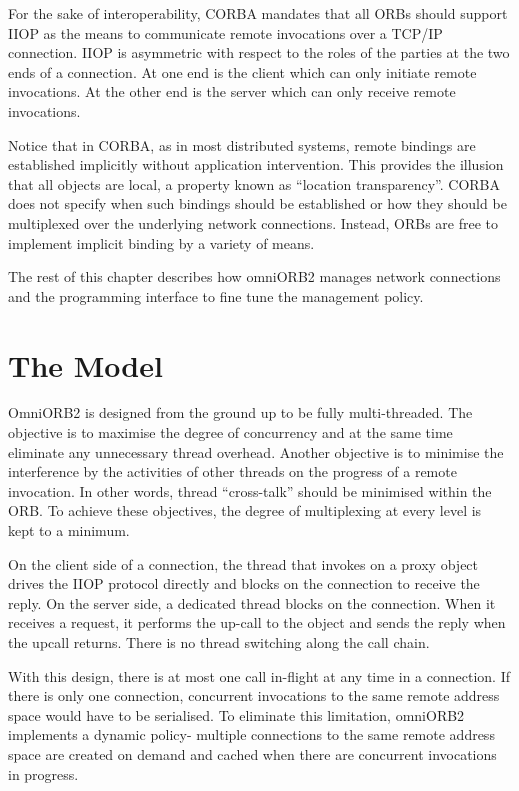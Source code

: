 \documentclass[11pt,twoside,onecolumn]{book}
\begin{document}
For the sake of interoperability, CORBA mandates that all ORBs should
support IIOP as the means to communicate remote invocations over a TCP/IP
connection. IIOP is asymmetric with respect to the roles of the parties at
the two ends of a connection. At one end is the client which can only
initiate remote invocations. At the other end is the server which can only
receive remote invocations.

Notice that in CORBA, as in most distributed systems, remote bindings are
established implicitly without application intervention. This provides the
illusion that all objects are local, a property known as ``location
transparency''. CORBA does not specify when such bindings should be
established or how they should be multiplexed over the underlying network
connections. Instead, ORBs are free to implement implicit binding by a
variety of means. 

The rest of this chapter describes how omniORB2 manages network
connections and the programming interface to fine tune the management
policy. 

\section{The Model}

OmniORB2 is designed from the ground up to be fully multi-threaded. The
objective is to maximise the degree of concurrency and at the same time
eliminate any unnecessary thread overhead. Another objective is to minimise
the interference by the activities of other threads on the progress of a
remote invocation. In other words, thread ``cross-talk'' should be
minimised within the ORB. To achieve these objectives, the degree of
multiplexing at every level is kept to a minimum.

On the client side of a connection, the thread that invokes on a proxy
object drives the IIOP protocol directly and blocks on the connection to
receive the reply. On the server side, a dedicated thread blocks on the
connection. When it receives a request, it performs the up-call to the
object and sends the reply when the upcall returns. There
is no thread switching along the call chain.

With this design, there is at most one call in-flight at any time in a
connection. If there is only one connection, concurrent invocations to the
same remote address space would have to be serialised. To eliminate this
limitation, omniORB2 implements a dynamic policy- multiple connections to
the same remote address space are created on demand and cached when there
are concurrent invocations in progress.
\end{document}
